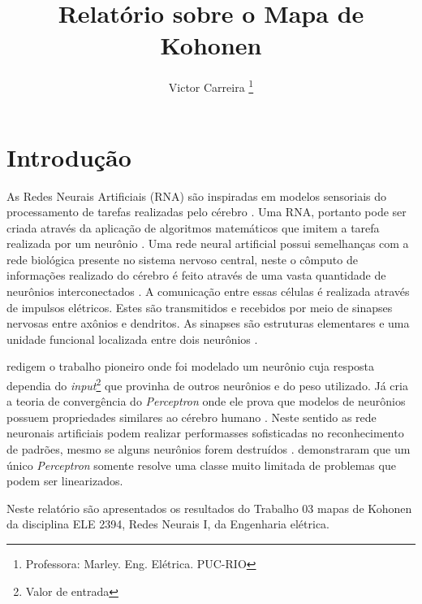 \documentclass[journal, a4paper]{IEEEtran}
\begin{document}
	\title{Relatório sobre o Mapa de Kohonen}
	\author{Victor Carreira
	\thanks{Professora: Marley. Eng. Elétrica. PUC-RIO}}
	\maketitle

\begin{abstract}

\end{abstract}


\section{Introdução}
    As Redes Neurais Artificiais (RNA) são inspiradas em modelos sensoriais do processamento de tarefas realizadas pelo cérebro \citep{Hagan1996}. Uma RNA, portanto pode ser criada através da aplicação de algoritmos matemáticos que imitem a tarefa realizada por um neurônio \citep{Nedjah2016}. Uma rede neural artificial possui semelhanças com a rede biológica presente no sistema nervoso central, neste o cômputo de informações realizado do cérebro é feito através de uma vasta quantidade de neurônios interconectados \citep{Feldman1988,Poulton2002}. A comunicação entre essas células é realizada através de impulsos elétricos. Estes são transmitidos e recebidos por meio de sinapses nervosas entre axônios e dendritos. As sinapses são estruturas elementares e uma unidade funcional localizada entre dois neurônios \citep{Krogh2008}.

	\citet{McCulloch1943} redigem o trabalho pioneiro onde foi modelado um neurônio cuja resposta dependia do \textit{input}\footnote{Valor de entrada} que provinha de outros neurônios e do peso utilizado.  Já \citet{Rosenblatt1962} cria a teoria de convergência do \textit{Perceptron} onde ele prova que modelos de neurônios possuem propriedades similares ao cérebro humano \citep{Kanal2001}. Neste sentido as rede neuronais artificiais podem realizar performasses sofisticadas no reconhecimento de padrões, mesmo se alguns neurônios forem destruídos \citep{Levy1997}. \citet{Minsky1969} demonstraram que um único  \textit{Perceptron} somente resolve uma classe muito limitada de problemas que podem ser linearizados.
	

	
	Neste relatório são apresentados os resultados do Trabalho 03 mapas de Kohonen da disciplina ELE 2394, Redes Neurais I, da Engenharia elétrica.
	
\end{document}
